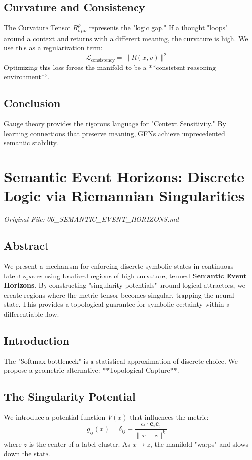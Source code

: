 \documentclass[11pt,a4paper]{report}
\begin{document}
\section{Curvature and Consistency}
The Curvature Tensor $R^\rho_{\sigma\mu\nu}$ represents the "logic gap." If a thought "loops" around a context and returns with a different meaning, the curvature is high. We use this as a regularization term:
\begin{equation}
    \mathcal{L}_{\text{consistency}} = \| R(x, v) \|^2
\end{equation}
Optimizing this loss forces the manifold to be a **consistent reasoning environment**.

\section{Conclusion}
Gauge theory provides the rigorous language for "Context Sensitivity." By learning connections that preserve meaning, GFNs achieve unprecedented semantic stability.

\chapter{Semantic Event Horizons: Discrete Logic via Riemannian Singularities}
\textit{Original File: 06\_SEMANTIC\_EVENT\_HORIZONS.md}

\section{Abstract}
We present a mechanism for enforcing discrete symbolic states in continuous latent spaces using localized regions of high curvature, termed \textbf{Semantic Event Horizons}. By constructing "singularity potentials" around logical attractors, we create regions where the metric tensor becomes singular, trapping the neural state. This provides a topological guarantee for symbolic certainty within a differentiable flow.

\section{Introduction}
The "Softmax bottleneck" is a statistical approximation of discrete choice. We propose a geometric alternative: **Topological Capture**.

\section{The Singularity Potential}
We introduce a potential function $V(x)$ that influences the metric:
\begin{equation}
    g_{ij}(x) = \delta_{ij} + \frac{\alpha \cdot \mathbf{c}_i \mathbf{c}_j}{\|x - z\|^k}
\end{equation}
where $z$ is the center of a label cluster. As $x \to z$, the manifold "warps" and slows down the state.
\end{document}
